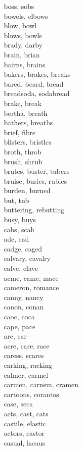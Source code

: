 boss, sobs\\
bowels, elbows\\
blow, bowl\\
blows, bowls\\
brady, darby\\
brain, brian\\
bairns, brains\\
bakers, brakes, breaks\\
bared, beard, bread\\
breadsoda, sodabread\\
brake, break\\
bertha, breath\\
bathers, breaths\\
brief, fibre\\
blisters, bristles\\
broth, throb\\
brush, shrub\\
brutes, buster, tubers\\
bruise, buries, rubies\\
burden, burned\\
but, tub\\
buttering, rebutting\\
busy, buys\\
cabs, scab\\
adc, cad\\
cadge, caged\\
calvary, cavalry\\
calve, clave\\
acme, came, mace\\
cameron, romance\\
canny, nancy\\
canon, conan\\
caoc, coca\\
cape, pace\\
arc, car\\
acre, care, race\\
caress, scares\\
carking, racking\\
calmer, carmel\\
carmen, carnem, cramen\\
cartoons, corantos\\
case, seca\\
acts, cast, cats\\
castile, elastic\\
actors, castor\\
casual, lacaus\\
